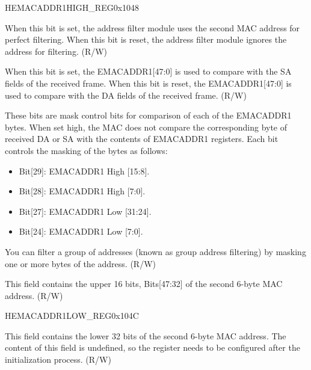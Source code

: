 \begin{register}{H}{EMACADDR1HIGH\_REG}{0x1048}\label{regdesc:EMACADDR1HIGHREG}
%
%
%
%
%
\regnewline%
\begin{regdesc}\begin{reglist}
\item [ADDRESS\_ENABLE1]When this bit is set, the address filter module uses the second MAC address  for perfect filtering. When this bit is reset, the address filter module ignores the address for filtering. (R/W)
\item [SOURCE\_ADDRESS]When this bit is set, the EMACADDR1[47:0] is used to compare with the SA fields of the received frame. When this bit is reset, the EMACADDR1[47:0] is used to compare with the DA fields of the received frame. (R/W)
\item [MASK\_BYTE\_CONTROL]These bits are mask control bits for comparison of each of the EMACADDR1 bytes. When set high, the MAC does not compare the corresponding byte of received DA or SA with the contents of EMACADDR1 registers. Each bit controls the masking of the bytes as follows: \begin{itemize}
\item Bit[29]: EMACADDR1 High [15:8]. \item Bit[28]: EMACADDR1 High [7:0]. \item Bit[27]: EMACADDR1 Low [31:24]. \item Bit[24]: EMACADDR1 Low [7:0].
\end{itemize} You can filter a group of addresses (known as group address filtering) by masking one or more bytes of the address. (R/W)
\item [MAC\_ADDRESS1\_HI]This field contains the upper 16 bits, Bits[47:32] of the second 6-byte MAC address. (R/W)
\end{reglist}\end{regdesc}
\end{register}


\begin{register}{H}{EMACADDR1LOW\_REG}{0x104C}\label{regdesc:EMACADDR1LOWREG}
%
\regnewline%
\begin{regdesc}\begin{reglist}
\item [EMACADDR1LOW\_REG]This field contains the lower 32 bits of the second 6-byte MAC address. The content of this field is undefined, so the register needs to be configured after the initialization process. (R/W)
\end{reglist}\end{regdesc}
\end{register}

